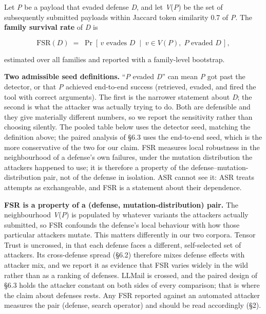 \documentclass[conference]{IEEEtran}
\begin{document}
Let \textit{P} be a payload that evaded defense \textit{D}, and let \textit{V}(\textit{P}) be the set of subsequently submitted payloads within Jaccard token similarity 0.7 of \textit{P}. The \textbf{family survival rate} of \textit{D} is

\begin{equation*}
\mathrm{FSR}(D) \;=\; \Pr\!\left[\, v \text{ evades } D \;\middle|\; v \in V(P),\; P \text{ evaded } D \,\right],
\end{equation*}

estimated over all families and reported with a family-level bootstrap.

\textbf{Two admissible seed definitions.} ``\textit{P} evaded \textit{D}'' can mean \textit{P} got past the detector, or that \textit{P} achieved end-to-end success (retrieved, evaded, and fired the tool with correct arguments). The first is the narrower statement about \textit{D}; the second is what the attacker was actually trying to do. Both are defensible and they give materially different numbers, so we report the sensitivity rather than choosing silently. The pooled table below uses the detector seed, matching the definition above; the paired analysis of \S6.3 uses the end-to-end seed, which is the more conservative of the two for our claim. FSR measures local robustness in the neighbourhood of a defense's own failures, under the mutation distribution the attackers happened to use; it is therefore a property of the defense--mutation-distribution pair, not of the defense in isolation. ASR cannot see it: ASR treats attempts as exchangeable, and FSR is a statement about their dependence.

\textbf{FSR is a property of a (defense, mutation-distribution) pair.} The neighbourhood \textit{V}(\textit{P}) is populated by whatever variants the attackers actually submitted, so FSR confounds the defense's local behaviour with how those particular attackers mutate. This matters differently in our two corpora. Tensor Trust is uncrossed, in that each defense faces a different, self-selected set of attackers. Its cross-defense spread (\S6.2) therefore mixes defense effects with attacker mix, and we report it as evidence that FSR varies widely in the wild rather than as a ranking of defenses. LLMail is crossed, and the paired design of \S6.3 holds the attacker constant on both sides of every comparison; that is where the claim about defenses rests. Any FSR reported against an automated attacker measures the pair (defense, search operator) and should be read accordingly (\S2).
\end{document}
